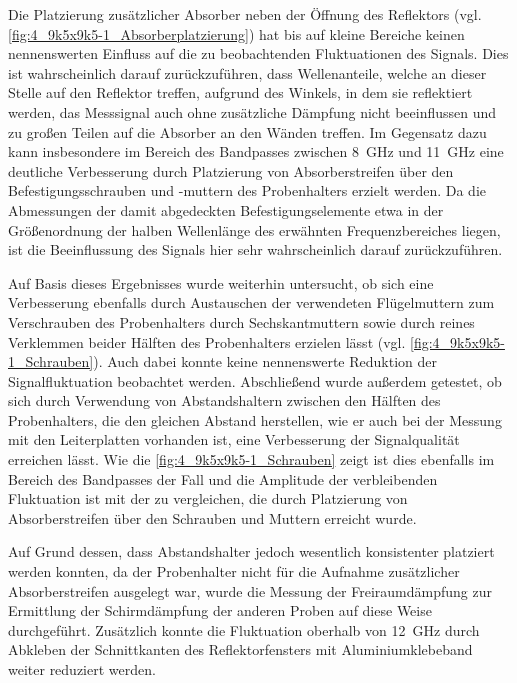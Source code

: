 Die Platzierung zusätzlicher Absorber neben der Öffnung des Reflektors (vgl. \Abb\ref{fig:4_9k5x9k5-1_Absorberplatzierung}) hat bis auf kleine Bereiche keinen nennenswerten Einfluss auf die zu beobachtenden Fluktuationen des Signals. Dies ist wahrscheinlich darauf zurückzuführen, dass Wellenanteile, welche an dieser Stelle auf den Reflektor treffen, aufgrund des Winkels, in dem sie reflektiert werden, das Messsignal auch ohne zusätzliche Dämpfung nicht beeinflussen und zu großen Teilen auf die Absorber an den Wänden treffen. Im Gegensatz dazu kann insbesondere im Bereich des Bandpasses zwischen \SI{8}{\giga\hertz} und  \SI{11}{\giga\hertz} eine deutliche Verbesserung durch Platzierung von Absorberstreifen über den Befestigungsschrauben und -muttern des Probenhalters erzielt werden. Da die Abmessungen der damit abgedeckten Befestigungselemente etwa in der Größenordnung der halben Wellenlänge des erwähnten Frequenzbereiches liegen, ist die Beeinflussung des Signals hier sehr wahrscheinlich darauf zurückzuführen. 
\par
\vspace{\linespace}
Auf Basis dieses Ergebnisses wurde weiterhin untersucht, ob sich eine Verbesserung ebenfalls durch Austauschen der verwendeten Flügelmuttern zum Verschrauben des Probenhalters durch Sechskantmuttern sowie durch reines Verklemmen beider Hälften des Probenhalters erzielen lässt (vgl. \Abb\ref{fig:4_9k5x9k5-1_Schrauben}). Auch dabei konnte keine nennenswerte Reduktion der Signalfluktuation beobachtet werden. Abschließend wurde außerdem getestet, ob sich durch Verwendung von Abstandshaltern zwischen den Hälften des Probenhalters, die den gleichen Abstand herstellen, wie er auch bei der Messung mit den Leiterplatten vorhanden ist, eine Verbesserung der Signalqualität erreichen lässt. Wie die \Abb\ref{fig:4_9k5x9k5-1_Schrauben} zeigt ist dies ebenfalls im Bereich des Bandpasses der Fall und die Amplitude der verbleibenden Fluktuation ist mit der zu vergleichen, die durch Platzierung von Absorberstreifen über den Schrauben und Muttern erreicht wurde. 
\par
\newpage
Auf Grund dessen, dass Abstandshalter jedoch wesentlich konsistenter platziert werden konnten, da der Probenhalter nicht für die Aufnahme zusätzlicher Absorberstreifen ausgelegt war, wurde die Messung der Freiraumdämpfung zur Ermittlung der Schirmdämpfung der anderen Proben auf diese Weise durchgeführt. Zusätzlich konnte die Fluktuation oberhalb von \SI{12}{\giga\hertz} durch Abkleben der Schnittkanten des Reflektorfensters mit Aluminiumklebeband weiter reduziert werden.
\par
\vspace{\linespace}






